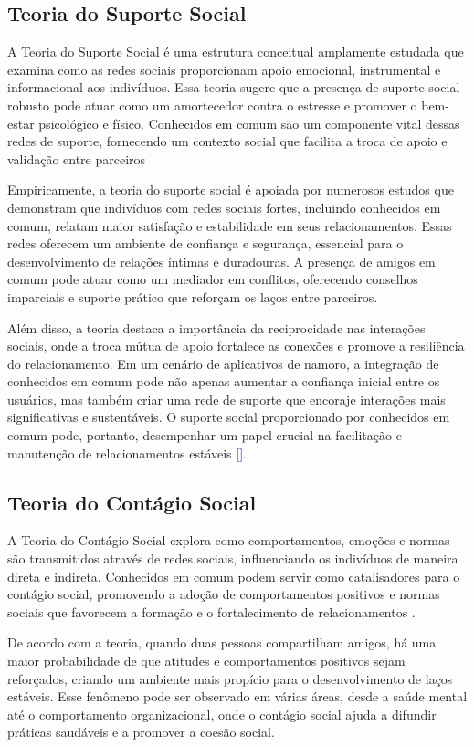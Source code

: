 \subsection{Teoria do Suporte Social}
A Teoria do Suporte Social é uma estrutura conceitual amplamente estudada que examina como as redes sociais proporcionam apoio emocional, instrumental e informacional aos indivíduos. Essa teoria sugere que a presença de suporte social robusto pode atuar como um amortecedor contra o estresse e promover o bem-estar psicológico e físico. Conhecidos em comum são um componente vital dessas redes de suporte, fornecendo um contexto social que facilita a troca de apoio e validação entre parceiros

Empiricamente, a teoria do suporte social é apoiada por numerosos estudos que demonstram que indivíduos com redes sociais fortes, incluindo conhecidos em comum, relatam maior satisfação e estabilidade em seus relacionamentos. Essas redes oferecem um ambiente de confiança e segurança, essencial para o desenvolvimento de relações íntimas e duradouras. A presença de amigos em comum pode atuar como um mediador em conflitos, oferecendo conselhos imparciais e suporte prático que reforçam os laços entre parceiros.

Além disso, a teoria destaca a importância da reciprocidade nas interações sociais, onde a troca mútua de apoio fortalece as conexões e promove a resiliência do relacionamento. Em um cenário de aplicativos de namoro, a integração de conhecidos em comum pode não apenas aumentar a confiança inicial entre os usuários, mas também criar uma rede de suporte que encoraje interações mais significativas e sustentáveis. O suporte social proporcionado por conhecidos em comum pode, portanto, desempenhar um papel crucial na facilitação e manutenção de relacionamentos estáveis \textcolor{blue}{[\cite{Cohen2004}]}.

\subsection{Teoria do Contágio Social}
A Teoria do Contágio Social explora como comportamentos, emoções e normas são transmitidos através de redes sociais, influenciando os indivíduos de maneira direta e indireta. Conhecidos em comum podem servir como catalisadores para o contágio social, promovendo a adoção de comportamentos positivos e normas sociais que favorecem a formação e o fortalecimento de relacionamentos .

De acordo com a teoria, quando duas pessoas compartilham amigos, há uma maior probabilidade de que atitudes e comportamentos positivos sejam reforçados, criando um ambiente mais propício para o desenvolvimento de laços estáveis. Esse fenômeno pode ser observado em várias áreas, desde a saúde mental até o comportamento organizacional, onde o contágio social ajuda a difundir práticas saudáveis e a promover a coesão social.

